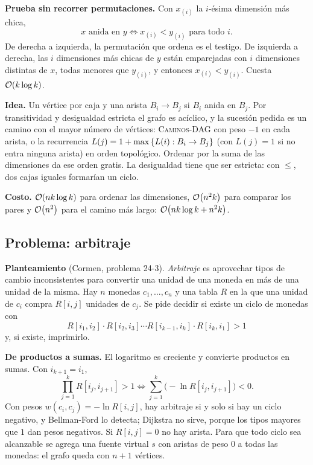 \documentclass[11pt,letterpaper]{article}
\begin{document}
\textbf{Prueba sin recorrer permutaciones.} Con $x_{(i)}$ la $i$-ésima
dimensión más chica,
\[
  x \text{ anida en } y \iff x_{(i)} < y_{(i)}
  \text{ para todo } i .
\]
De derecha a izquierda, la permutación que ordena es el testigo. De
izquierda a derecha, las $i$ dimensiones más chicas de $y$ están
emparejadas con $i$ dimensiones distintas de $x$, todas menores que
$y_{(i)}$, y entonces $x_{(i)} < y_{(i)}$. Cuesta $\mathcal{O}\!\left(k \log k\right)$.

\textbf{Idea.} Un vértice por caja y una arista $B_i \to B_j$ si $B_i$
anida en $B_j$. Por transitividad y desigualdad estricta el grafo es
acíclico, y la sucesión pedida es un camino con el mayor número de
vértices: \textsc{Caminos-DAG} con peso $-1$ en cada arista, o la
recurrencia $L(j) = 1 + \max \left\{ L(i) : B_i \to B_j \right\}$ (con $L(j) = 1$
si no entra ninguna arista) en orden topológico. Ordenar por la suma
de las dimensiones da ese orden gratis. La desigualdad tiene que ser
estricta: con $\le$, dos cajas iguales formarían un ciclo.

\textbf{Costo.} $\mathcal{O}\!\left(n k \log k\right)$ para ordenar las dimensiones,
$\mathcal{O}\!\left(n^2 k\right)$ para comparar los pares y $\mathcal{O}\!\left(n^2\right)$ para el camino más
largo: $\mathcal{O}\!\left(n k \log k + n^2 k\right)$.


\subsection*{Problema: arbitraje}

\textbf{Planteamiento} (Cormen, problema 24-3). \emph{Arbitraje} es
aprovechar tipos de cambio inconsistentes para convertir una unidad
de una moneda en más de una unidad de la misma. Hay $n$ monedas
$c_1, \dots, c_n$ y una tabla $R$ en la que una unidad de $c_i$
compra $R[i, j]$ unidades de $c_j$. Se pide decidir si existe un ciclo
de monedas con
\[
  R[i_1, i_2] \cdot R[i_2, i_3] \cdots R[i_{k-1}, i_k] \cdot
  R[i_k, i_1] > 1
\]
y, si existe, imprimirlo.

\textbf{De productos a sumas.} El logaritmo es creciente y convierte
productos en sumas. Con $i_{k+1} = i_1$,
\[
  \prod_{j=1}^{k} R[i_j, i_{j+1}] > 1
  \iff \sum_{j=1}^{k} \bigl( -\ln R[i_j, i_{j+1}] \bigr) < 0 .
\]
Con pesos $w(c_i, c_j) = -\ln R[i, j]$, hay arbitraje si y solo si
hay un ciclo negativo, y Bellman-Ford lo detecta; Dijkstra no sirve,
porque los tipos mayores que $1$ dan pesos negativos. Si
$R[i, j] = 0$ no hay arista. Para que todo ciclo sea alcanzable se
agrega una fuente virtual $s$ con aristas de peso $0$ a todas las
monedas: el grafo queda con $n + 1$ vértices.
\end{document}
